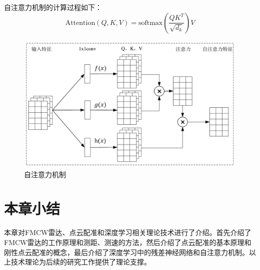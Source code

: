 自注意力机制的计算过程如下：
\begin{equation}
	\text{Attention}(Q,K,V) = \text{softmax}\left(\frac{QK^T}{\sqrt{d_k}}\right)V
\end{equation}
\begin{figure}[htbp]
	\centering
	\includegraphics[width=\linewidth]{figures/注意力.pdf}
	\caption{自注意力机制}
	\label{self-attention}
\end{figure}
\section{本章小结}
本章对FMCW雷达、点云配准和深度学习相关理论技术进行了介绍。首先介绍了FMCW雷达的工作原理和测距、测速的方法，然后介绍了点云配准的基本原理和刚性点云配准的概念，最后介绍了深度学习中的残差神经网络和自注意力机制。以上技术理论为后续的研究工作提供了理论支撑。
